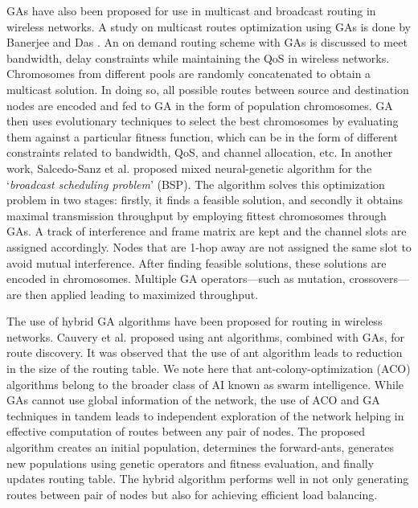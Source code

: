 \documentclass[journal]{IEEEtran}
\begin{document}
GAs have also been proposed for use in multicast and broadcast routing in wireless networks. A study on multicast routes optimization using GAs is done by Banerjee and Das \cite{banerjee2001fast}. An on demand routing scheme with GAs is discussed to meet bandwidth, delay constraints while maintaining the QoS in wireless networks. Chromosomes from different pools are randomly concatenated to obtain a multicast solution. In doing so, all possible routes between source and destination nodes are encoded and fed to GA in the form of population chromosomes. GA then uses evolutionary techniques to select the best chromosomes by evaluating them against a particular fitness function, which can be in the form of different constraints related to bandwidth, QoS, and channel allocation, etc. In another work, Salcedo-Sanz et al. \cite{salcedo2003mixed} proposed mixed neural-genetic algorithm for the `\textit{broadcast scheduling problem}' (BSP). The algorithm solves this optimization problem in two stages: firstly, it finds a feasible solution, and secondly it obtains maximal transmission throughput by employing fittest chromosomes through GAs. A track of interference and frame matrix are kept and the channel slots are assigned accordingly. Nodes that are 1-hop away are not assigned the same slot to avoid mutual interference. After finding feasible solutions, these solutions are encoded in chromosomes. Multiple GA operators---such as mutation, crossovers---are then applied leading to maximized throughput.

The use of hybrid GA algorithms have been proposed for routing in wireless networks. Cauvery et al. \cite{nkrouting} proposed using ant algorithms, combined with GAs, for route discovery. It was observed that the use of ant algorithm leads to reduction in the size of the routing table. We note here that ant-colony-optimization (ACO) algorithms belong to the broader class of AI known as swarm intelligence. While GAs cannot use global information of the network, the use of ACO and GA techniques in tandem leads to independent exploration of the network helping in effective computation of routes between any pair of nodes. The proposed algorithm creates an initial population, determines the forward-ants, generates new populations using genetic operators and fitness evaluation, and finally updates routing table. The hybrid algorithm performs well in not only generating routes between pair of nodes but also for achieving efficient load balancing.

\vspace{2mm}
\end{document}
